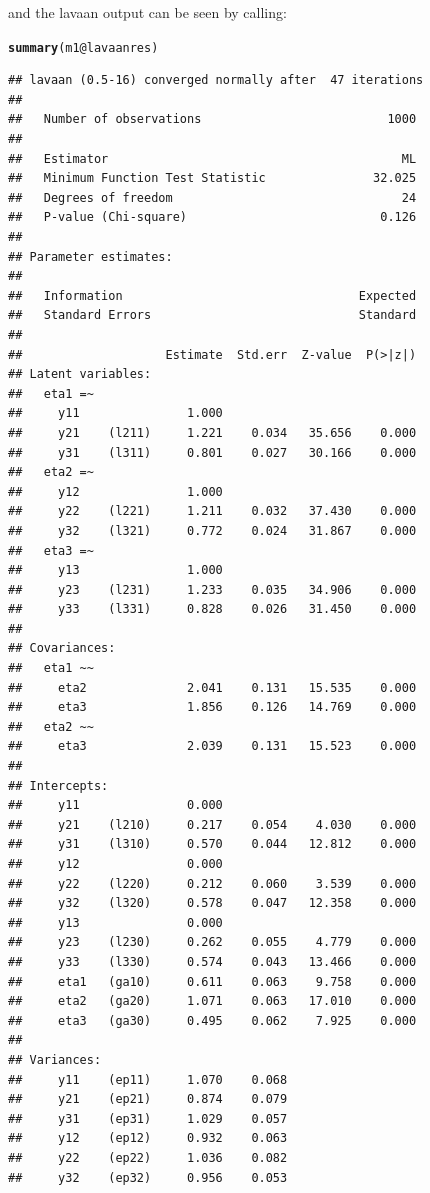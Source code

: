 \documentclass[10pt]{article}\usepackage{graphicx, color}
\makeatletter
\newcommand{\hlfunctioncall}[1]{\textcolor[rgb]{0.501960784313725,0,0.329411764705882}{\textbf{#1}}}%
\newenvironment{kframe}{%
 \def\at@end@of@kframe{}%
 \ifinner\ifhmode%
  \def\at@end@of@kframe{\end{minipage}}%
  \begin{minipage}{\columnwidth}%
 \fi\fi%
 \def\FrameCommand##1{\hskip\@totalleftmargin \hskip-\fboxsep
 \colorbox{shadecolor}{##1}\hskip-\fboxsep
     \hskip-\linewidth \hskip-\@totalleftmargin \hskip\columnwidth}%
 \MakeFramed {\advance\hsize-\width
   \@totalleftmargin\z@ \linewidth\hsize
   \@setminipage}}%
 {\par\unskip\endMakeFramed%
 \at@end@of@kframe}
\newenvironment{knitrout}{}{} %
\makeatother
\begin{document}
%
and the lavaan output can be seen by calling:
%
\begin{knitrout}
\color{fgcolor}\begin{kframe}
\begin{alltt}
\hlfunctioncall{summary}(m1@lavaanres)
\end{alltt}
\begin{verbatim}
## lavaan (0.5-16) converged normally after  47 iterations
## 
##   Number of observations                          1000
## 
##   Estimator                                         ML
##   Minimum Function Test Statistic               32.025
##   Degrees of freedom                                24
##   P-value (Chi-square)                           0.126
## 
## Parameter estimates:
## 
##   Information                                 Expected
##   Standard Errors                             Standard
## 
##                    Estimate  Std.err  Z-value  P(>|z|)
## Latent variables:
##   eta1 =~
##     y11               1.000
##     y21    (l211)     1.221    0.034   35.656    0.000
##     y31    (l311)     0.801    0.027   30.166    0.000
##   eta2 =~
##     y12               1.000
##     y22    (l221)     1.211    0.032   37.430    0.000
##     y32    (l321)     0.772    0.024   31.867    0.000
##   eta3 =~
##     y13               1.000
##     y23    (l231)     1.233    0.035   34.906    0.000
##     y33    (l331)     0.828    0.026   31.450    0.000
## 
## Covariances:
##   eta1 ~~
##     eta2              2.041    0.131   15.535    0.000
##     eta3              1.856    0.126   14.769    0.000
##   eta2 ~~
##     eta3              2.039    0.131   15.523    0.000
## 
## Intercepts:
##     y11               0.000
##     y21    (l210)     0.217    0.054    4.030    0.000
##     y31    (l310)     0.570    0.044   12.812    0.000
##     y12               0.000
##     y22    (l220)     0.212    0.060    3.539    0.000
##     y32    (l320)     0.578    0.047   12.358    0.000
##     y13               0.000
##     y23    (l230)     0.262    0.055    4.779    0.000
##     y33    (l330)     0.574    0.043   13.466    0.000
##     eta1   (ga10)     0.611    0.063    9.758    0.000
##     eta2   (ga20)     1.071    0.063   17.010    0.000
##     eta3   (ga30)     0.495    0.062    7.925    0.000
## 
## Variances:
##     y11    (ep11)     1.070    0.068
##     y21    (ep21)     0.874    0.079
##     y31    (ep31)     1.029    0.057
##     y12    (ep12)     0.932    0.063
##     y22    (ep22)     1.036    0.082
##     y32    (ep32)     0.956    0.053

\end{verbatim}
\end{kframe}
\end{knitrout}
\end{document}
